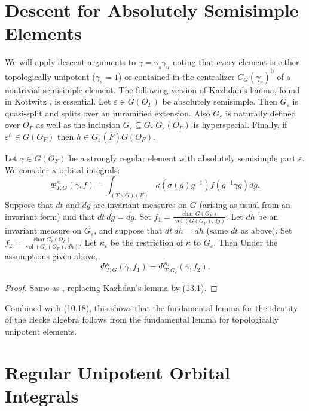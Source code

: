 \documentclass{amsart}
\newenvironment{cthm}[1]
  {\renewcommand\thethm{\bf #1}\thm}
  {\endthm}
\def\Char{\operatorname{char}}               %
\def\Vol{\operatorname{vol}}
\def\HALESU{9}
\def\KOTTWITZS{16}
\begin{document}
\vskip3pc
\section{Descent for Absolutely Semisimple Elements} %

We will apply descent arguments to $\gamma=\gamma_s\gamma_u$
noting that every element is either topologically unipotent ($\gamma_s=1$) 
or contained in the centralizer $C_G(\gamma_s)^0$
of a nontrivial semisimple element.  The following version of Kazhdan's lemma,
found in
Kottwitz \cite{\KOTTWITZS}, is essential. 
\begin{cthm}{Lemma 13.1}  Let $\varepsilon\in G(O_F)$ be
absolutely semisimple. Then $G_{\varepsilon}$ is quasi-split
and splits over an unramified extension.  Also $G_{\varepsilon}$
is naturally defined over $O_F$ as well as the inclusion $G_\varepsilon\subseteq G$.
$G_{\varepsilon}(O_F)$ is hyperspecial.  Finally, if $\varepsilon^h\in G(O_F)$ then
$h\in G_\varepsilon(\overline F) G(O_F)$.
\end{cthm}

Let $\gamma\in G(O_F)$ be a strongly
regular element with absolutely semisimple part $\varepsilon$.  
We consider $\kappa$-orbital integrals:
$$
\Phi_{T,G}^\kappa(\gamma,f)
=\int_{(T\backslash G)(F)}
\kappa(\sigma(g)g^{-1})
f(g^{-1}\gamma g)d\dot g.
$$
Suppose that $dt$ and $dg$ are invariant measures on $G$
(arising as usual from an invariant form) and that
$dt\ d\dot g = dg$. Set
$f_1=\frac{\Char G(O_F)}{\Vol(G(O_F),dg)}$.
Let $dh$ be an invariant measure on $G_{\varepsilon}$, and suppose
that $dt\ d\dot h = dh$ (same $dt$ as above). Set
$f_2=\frac{\Char G_{\varepsilon}(O_F)}{\Vol(G_{\varepsilon}(O_F),dh)}$.
Let $\kappa_\varepsilon$ be the restriction of $\kappa$ to $G_\varepsilon$.  Then
\begin{cthm}{Lemma 13.2}  Under the assumptions given above,
$$
\Phi_{T,G}^\kappa(\gamma,f_1) = \Phi_{T,G_\varepsilon}^{\kappa_\varepsilon}(\gamma,f_2).
$$
\end{cthm}

\begin{proof}  Same as \cite{\HALESU}, replacing Kazhdan's lemma by (13.1).
\end{proof}

Combined with (10.18), this shows that the fundamental lemma for the identity of the
Hecke algebra follows from the fundamental lemma for topologically unipotent elements.

\vskip3pc
\section{Regular Unipotent Orbital Integrals} %
\end{document}
